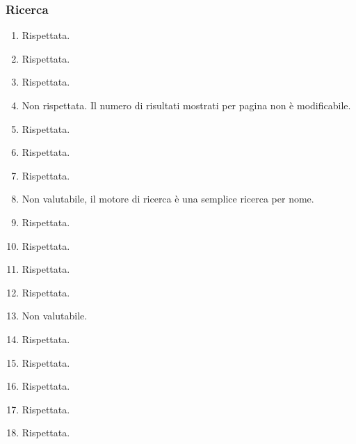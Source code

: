 \documentclass[../Report.tex]{subfiles}
\begin{document}
    \subsubsection{Ricerca}
    \begin{enumerate}
        \item Rispettata. 
        \item Rispettata. 
        \item Rispettata.
        \item Non rispettata. Il numero di risultati mostrati per pagina non è modificabile.
        \item Rispettata.
        \item Rispettata.
        \item Rispettata.
        \item Non valutabile, il motore di ricerca è una semplice ricerca per nome.
        \item Rispettata.
        \item Rispettata. 
        \item Rispettata.
        \item Rispettata.
        \item Non valutabile. 
        \item Rispettata.
        \item Rispettata.
        \item Rispettata.
        \item Rispettata.
        \item Rispettata.
        
    \end{enumerate}
\end{document}
